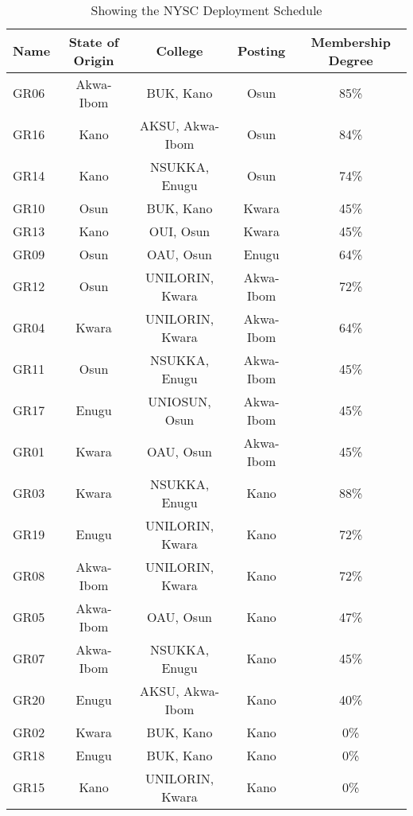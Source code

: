\documentclass[a4paper,openany]{book}
\begin{document}
					\paragraph{}
						\begin{table}[!th]
							\begin{tabular}{|l|c|c|c|c|}
							\hline
							\textbf{Name} & \textbf{State of Origin} & \textbf{College} & \textbf{Posting} & \textbf{Membership Degree} \\
							\hline
							GR06 & Akwa-Ibom & BUK, Kano & Osun & 85\% \\
							\hline
							GR16 & Kano & AKSU, Akwa-Ibom & Osun & 84\% \\
							\hline
							GR14 & Kano & NSUKKA, Enugu & Osun & 74\% \\
							\hline
							GR10 & Osun & BUK, Kano & Kwara & 45\% \\
							\hline
							GR13 & Kano & OUI, Osun & Kwara & 45\% \\
							\hline
							GR09 & Osun & OAU, Osun & Enugu & 64\% \\
							\hline
							GR12 & Osun & UNILORIN, Kwara & Akwa-Ibom & 72\% \\
							\hline
							GR04 & Kwara & UNILORIN, Kwara & Akwa-Ibom & 64\% \\
							\hline
							GR11 & Osun & NSUKKA, Enugu & Akwa-Ibom & 45\% \\
							\hline
							GR17 & Enugu & UNIOSUN, Osun & Akwa-Ibom & 45\% \\
							\hline
							GR01 & Kwara & OAU, Osun & Akwa-Ibom & 45\% \\
							\hline
							GR03 & Kwara & NSUKKA, Enugu & Kano & 88\% \\
							\hline
							GR19 & Enugu & UNILORIN, Kwara & Kano & 72\% \\
							\hline
							GR08 & Akwa-Ibom & UNILORIN, Kwara & Kano & 72\% \\
							\hline
							GR05 & Akwa-Ibom & OAU, Osun & Kano & 47\% \\
							\hline
							GR07 & Akwa-Ibom & NSUKKA, Enugu & Kano & 45\% \\
							\hline
							GR20 & Enugu & AKSU, Akwa-Ibom & Kano & 40\% \\
							\hline
							GR02 & Kwara & BUK, Kano & Kano & 0\% \\
							\hline
							GR18 & Enugu & BUK, Kano & Kano & 0\% \\
							\hline
							GR15 & Kano & UNILORIN, Kwara & Kano & 0\% \\
							\hline
							\end{tabular}
							\caption{Showing the NYSC Deployment Schedule}
							\label{ex:table}
						\end{table}
\end{document}
